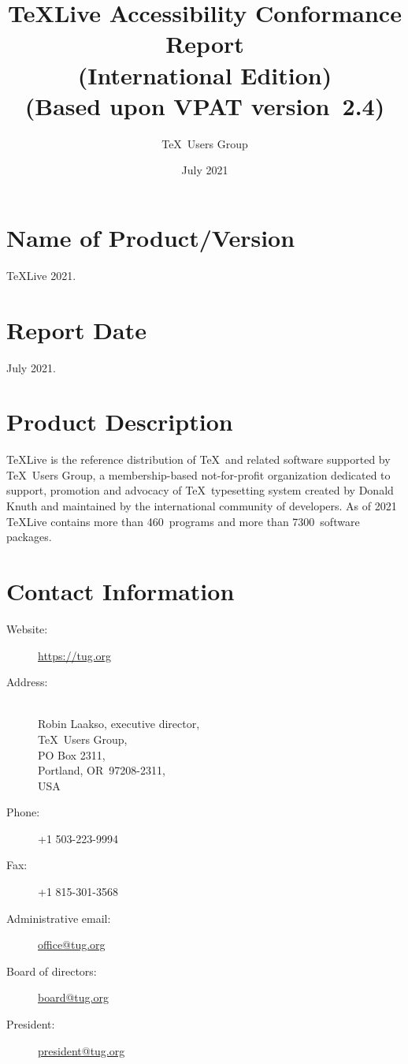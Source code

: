 \documentclass{report}
\begin{document}
\title{\TeX Live Accessibility Conformance Report\\
  (International Edition)\\
(Based upon VPAT\textsuperscript{\textregistered} version~2.4)}
\author{\TeX\ Users Group}
\date{July 2021}
\maketitle

\clearpage

\tableofcontents

\clearpage

\section{Name of Product/Version}
\label{sec:name}

\TeX Live 2021.


\section{Report Date}
\label{sec:date}

July 2021.


\section{Product Description}
\label{sec:description}

\TeX Live is the reference distribution of \TeX\ and related software
supported by \TeX\ Users Group, a membership-based not-for-profit
organization dedicated to support, promotion and advocacy of \TeX\
typesetting system created by Donald Knuth and maintained by the
international community of developers.  As of 2021 \TeX Live contains
more than 460~programs and more than 7300~software packages.

\section{Contact Information}
\label{sec:contact_info}

  \begin{description}
  \item[Website:]  \url{https://tug.org}
  \item[Address:] \leavevmode\\
    Robin Laakso, executive director,\\
    \TeX\ Users Group,\\
    PO Box 2311,\\
    Portland, OR~97208-2311,\\
    USA
  \item[Phone:] +1 503-223-9994
  \item[Fax:] +1 815-301-3568
  \item[Administrative email:] \href{mailto:office@tug.org}{office@tug.org}
  \item[Board of directors:] \href{mailto:board@tug.org}{board@tug.org}
  \item[President:] \href{mailto:president@tug.org}{president@tug.org}
  \end{description}
\end{document}
